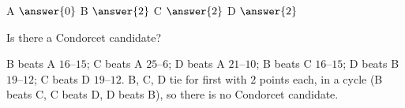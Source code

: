 \documentclass[12pt]{ximera}
\begin{document}
\begin{problem}
\begin{prompt}
A $\answer{0}$ \quad B $\answer{2}$ \quad C $\answer{2}$ \quad D $\answer{2}$

\smallskip
Is there a Condorcet candidate?
\begin{multipleChoice}
\end{multipleChoice}
\begin{feedback}
B beats A $16$--$15$; C beats A $25$--$6$; D beats A $21$--$10$; B beats C $16$--$15$;
D beats B $19$--$12$; C beats D $19$--$12$. B, C, D tie for first with $2$ points each,
in a cycle (B beats C, C beats D, D beats B), so there is no Condorcet candidate.
\end{feedback}
\end{prompt}
\end{problem}
\end{document}
